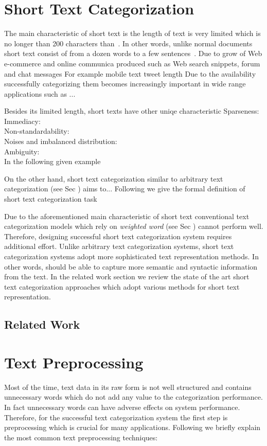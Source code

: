 \section{Short Text Categorization}
The main characteristic of short text is the length of text is very limited which is no longer than 200 characters than~\cite{song2014short}. In other words, unlike normal documents short text consist of from a dozen words to a few sentences~\cite{song2014short}. Due to grow of Web e-commerce and online communica produced such as Web search snippets, forum and chat messages
For example mobile text
tweet length
Due to the availability  successfully categorizing them becomes increasingly important in wide range applications such as ...

Besides its limited length, short texts have other uniqe characteristic 
Sparseness:\\
Immediacy:\\
Non-standardability:\\
Noises and imbalanced distribution:\\
Ambiguity:\\
In the following given example 

On the other hand, short text categorization similar to arbitrary text categorization (see Sec ) aims to...
Following we give the formal definition of short text categorization task 

Due to the aforementioned main characteristic of short text conventional text categorization models which rely on \textit{weighted word} (see Sec ) cannot perform well. Therefore, designing successful short text categorization system requires additional effort. Unlike arbitrary text categorization systems, short text categorization systems adopt more sophisticated text representation methods. In other words, should be able to capture more semantic and syntactic information from the text. In the related work section we review the state of the art short text categorization approaches which adopt various methods for short text representation. 
\subsection{Related Work}
\section{Text Preprocessing}
Most of the time, text data in its raw form is not well structured and contains unnecessary words which do not add any value to the categorization performance. In fact unnecessary words can have adverse effects on system performance. Therefore, for the successful text categorization system the first step is preprocessing which is crucial for many applications. Following we briefly explain the most common text preprocessing techniques:

